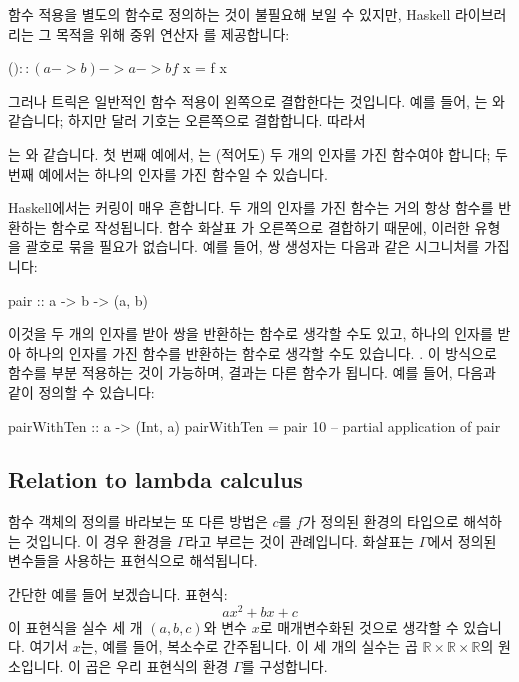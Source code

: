 \documentclass[DaoFP]{subfiles}
\begin{document}
함수 적용을 별도의 함수로 정의하는 것이 불필요해 보일 수 있지만, Haskell 라이브러리는 그 목적을 위해 중위 연산자 \hask{$}를 제공합니다:
\begin{haskell}
($) :: (a -> b) -> a -> b
f $ x = f x
\end{haskell}
그러나 트릭은 일반적인 함수 적용이 왼쪽으로 결합한다는 것입니다. 예를 들어, 는 와 같습니다; 하지만 달러 기호는 오른쪽으로 결합합니다. 따라서
는 와 같습니다. 첫 번째 예에서, 는 (적어도) 두 개의 인자를 가진 함수여야 합니다; 두 번째 예에서는 하나의 인자를 가진 함수일 수 있습니다.

Haskell에서는 커링이 매우 흔합니다. 두 개의 인자를 가진 함수는 거의 항상 함수를 반환하는 함수로 작성됩니다. 함수 화살표 \hask{->}가 오른쪽으로 결합하기 때문에, 이러한 유형을 괄호로 묶을 필요가 없습니다. 예를 들어, 쌍 생성자는 다음과 같은 시그니처를 가집니다:
\begin{haskell}
pair :: a -> b -> (a, b)
\end{haskell}
이것을 두 개의 인자를 받아 쌍을 반환하는 함수로 생각할 수도 있고, 하나의 인자를 받아 하나의 인자를 가진 함수를 반환하는 함수로 생각할 수도 있습니다. . 이 방식으로 함수를 부분 적용하는 것이 가능하며, 결과는 다른 함수가 됩니다. 예를 들어, 다음과 같이 정의할 수 있습니다:
\begin{haskell}
pairWithTen :: a -> (Int, a)
pairWithTen = pair 10 -- partial application of pair
\end{haskell}



\subsection{Relation to lambda calculus}

함수 객체의 정의를 바라보는 또 다른 방법은 $c$를 $f$가 정의된 환경의 타입으로 해석하는 것입니다. 이 경우 환경을 $\Gamma$라고 부르는 것이 관례입니다. 화살표는 $\Gamma$에서 정의된 변수들을 사용하는 표현식으로 해석됩니다.

간단한 예를 들어 보겠습니다. 표현식:
\[a x^2 + b x + c\]
이 표현식을 실수 세 개 $(a, b, c)$와 변수 $x$로 매개변수화된 것으로 생각할 수 있습니다. 여기서 $x$는, 예를 들어, 복소수로 간주됩니다. 이 세 개의 실수는 곱 $ \times {} \times {}$의 원소입니다. 이 곱은 우리 표현식의 환경 $\Gamma$를 구성합니다.
\end{document}
